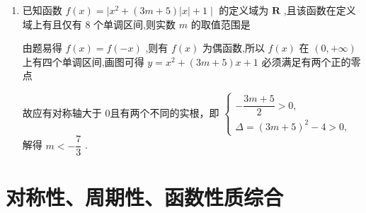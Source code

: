 \begin{enumerate}
    \begin{jieda}
        在 ${f}_{1}\left( x\right)$ 中,任意 $a > 0$ ,由单调递增可得 ${f}_{1}\left( {x + a}\right)  > {f}_{1}\left( x\right)$ ,又 ${f}_{1}\left( a\right)  \leq  0$ ,所以存在 $a > 0$ ,使得 ${f}_{1}\left( {x + a}\right)  > {f}_{1}\left( x\right)  + {f}_{1}\left( a\right)$ ,故 ${f}_{1}\left( x\right)$ 具有 “ $P$ 性质”; 
        
        在 ${f}_{2}\left( x\right)$ 中,设 $a = {x}_{0} < 0$ ,由单调递减可得 ${f}_{2}\left( {x + a}\right)  > {f}_{2}\left( x\right)$ ,又 ${f}_{2}\left( a\right)  = 0$ ,所以存在 $a < 0$ ,使得 ${f}_{2}\left( {x + a}\right)  > {f}_{2}\left( x\right)  + {f}_{2}\left( a\right)$ ,故 ${f}_{2}\left( x\right)$ 具有“ $P$ 性质”.
    \end{jieda}
    \item 已知函数 $f\left( x\right)  = \mid {x}^{2} + \left( {{3m} + 5}\right) \left| x\right|  + 1 \mid$ 的定义域为 $\mathbf{R}$ ,且该函数在定义域上有且仅有 8 个单调区间,则实数 $m$ 的取值范围是
    \begin{jieda}
        由题易得 $f\left( x\right)  = f\left( {-x}\right)$ ,则有 $f\left( x\right)$ 为偶函数,所以 $f\left( x\right)$ 在 $\left( {0, + \infty }\right)$ 上有四个单调区间,画图可得 $y = {x}^{2} + \left( {{3m} + 5}\right) x + 1$ 必须满足有两个正的零点
        
        故应有对称轴大于 0且有两个不同的实根，即 $\left\{  \begin{array}{l}  - \dfrac{{3m} + 5}{2} > 0, \\  \Delta  = {\left( 3m + 5\right) }^{2} - 4 > 0, \end{array}\right.$ 解得 $m <  - \dfrac{7}{3}$ .
    \end{jieda}
\end{enumerate}


\section*{对称性、周期性、函数性质综合}
